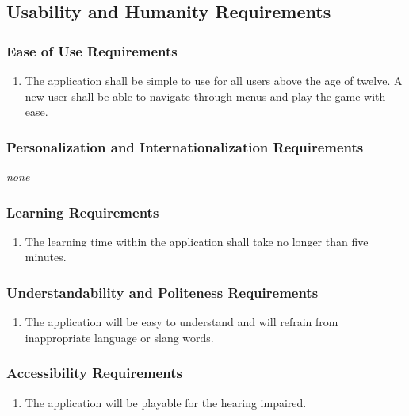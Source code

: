 \documentclass[12pt, titlepage]{article}
\begin{document}

\subsection{Usability and Humanity Requirements}
\label{sub:usability_and_humanity_requirements}

\subsubsection{Ease of Use Requirements}
\label{ssub:ease_of_use_requirements}
\begin{enumerate}[{UH}1. ]
	\item The application shall be simple to use for all users above the age of twelve. A new user shall be able to navigate through menus and play the game with ease.
\end{enumerate}

\subsubsection{Personalization and Internationalization Requirements}
\label{ssub:personalization_and_internationalization_requirements}
\emph{none}

\subsubsection{Learning Requirements}
\label{ssub:learning_requirements}
\begin{enumerate}[{UH}2. ]
	\item The learning time within the application shall take no longer than five minutes.
\end{enumerate}

\subsubsection{Understandability and Politeness Requirements}
\label{ssub:understandability_and_politeness_requirements}
\begin{enumerate}[{UH}3. ]
	\item The application will be easy to understand and will refrain from inappropriate language or slang words.
\end{enumerate}

\subsubsection{Accessibility Requirements}
\label{ssub:accessibility_requirements}
\begin{enumerate}[{UH}4. ]
	\item The application will be playable for the hearing impaired.
\end{enumerate}
\end{document}
